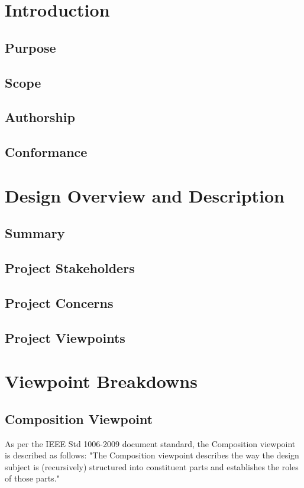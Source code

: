 \documentclass[onecolumn, draftclsnofoot,10pt, compsoc]{IEEEtran}
\begin{document}
        
        \section{Introduction}
        \subsection{Purpose}
        \subsection{Scope}
        \subsection{Authorship}
        \subsection{Conformance}
       
        \section{Design Overview and Description}
        \subsection{Summary}
        \subsection{Project Stakeholders}
        \subsection{Project Concerns}
        \subsection{Project Viewpoints}
        
        \section{Viewpoint Breakdowns}
        
        \subsection{Composition Viewpoint}
        As per the IEEE Std 1006-2009 document standard, the Composition viewpoint is described as follows: "The Composition viewpoint describes the way the design subject is (recursively) structured into constituent parts and establishes the roles of those parts."
\end{document}
